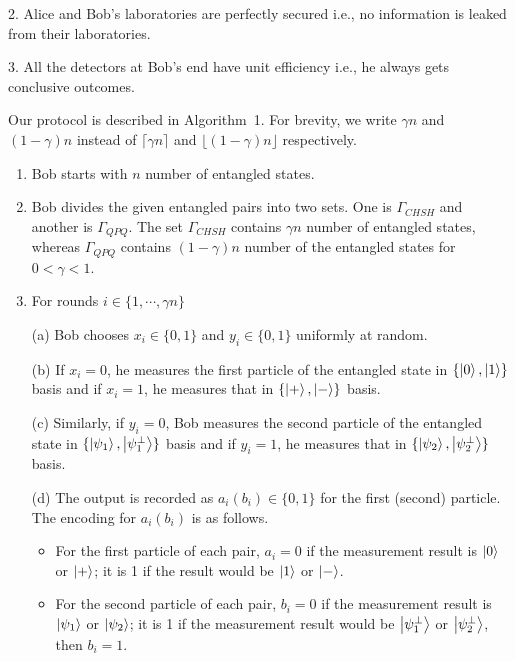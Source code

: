\documentclass[twocolumn,pra,aps,amssymb]{revtex4}
\begin{document}
2. Alice and Bob's laboratories are perfectly secured i.e., no information is leaked from their laboratories. 

3. All the detectors at Bob's end have unit efficiency i.e., he always gets conclusive outcomes. 

Our protocol is described in Algorithm~1. For brevity, we write $\gamma n$ and $(1-\gamma) n$ instead of $\lceil{\gamma n}\rceil$ and $\lfloor{(1-\gamma) n}\rfloor$ respectively.

\begin{algorithm}[htbp]
{\scriptsize
\begin{enumerate}
\item Bob starts with $n$ number of entangled states.
\item Bob divides the given entangled pairs into two sets. One is $\Gamma_{CHSH}$ and another is $\Gamma_{QPQ}$. The set $\Gamma_{CHSH}$ contains $\gamma n$ number of entangled states, whereas $\Gamma_{QPQ}$ contains $(1-\gamma) n$ number of the entangled states for $0<\gamma<1 $. 
 \item For rounds $i \in \{1,\cdots, \gamma n\}$

\hspace{5pt} (a) Bob chooses $x_i\in\{0,1\}$ and $y_i\in\{0,1\}$ uniformly at random. 

\hspace{5pt} (b) If $x_i=0$, he measures the first particle of the entangled state in $\{\left|0\right\rangle, \left|1\right\rangle\}$ basis and if $x_i=1$, he measures that in $\{\left|+\right\rangle, \left|-\right\rangle\}$ basis. 

\hspace{5pt} (c) Similarly, if $y_i=0$, Bob measures the second particle of the entangled state in $\{\left|\psi_1\right\rangle, \left|\psi_1^{\perp}\right\rangle\}$ basis and if $y_i=1$, he measures that in $\{\left|\psi_2\right\rangle, \left|\psi_2^{\perp}\right\rangle\}$ basis. 

\hspace{5pt} (d) The output is recorded as $a_i (b_i) \in\{0,1\}$ for the first (second) particle. 
The encoding for $a_i (b_i)$ is as follows. 
\begin{itemize}
\item For the first particle of each pair, $a_i=0$ if the measurement result is $\left|0\right\rangle$ or $\left|+\right\rangle$; it is 1 if the result would be $\left|1\right\rangle$ or $\left|-\right\rangle$.
\item For the second particle of each pair, $b_i=0$ if the measurement result is $\left|\psi_1\right\rangle$ or $\left|\psi_2\right\rangle$; it is 1 if the measurement result would be $\left|\psi_1^{\perp}\right\rangle$ or $\left|\psi_2^{\perp}\right\rangle$, then $b_i=1$.
\end{itemize}


\end{enumerate}}
\end{algorithm}
\end{document}
